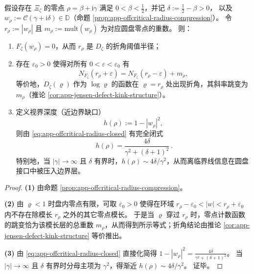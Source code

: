 \begin{theorem}[离临界线信息的折角定位与视界深度]\label{thm:app-jensen-offcritical-kink-localization}
假设存在 \(\Xi_{\zeta}\) 的零点 \(\rho=\beta+\mathrm{i}\gamma\) 满足 \(0<\beta<\tfrac12\)，并记 \(\delta:=\tfrac12-\beta>0\)，
以及 \(w_{\rho}:=\mathcal{C}(\gamma+\mathrm{i}\delta)\in\mathbb{D}\)（命题 \ref{prop:app-offcritical-radius-compression}）。
令 \(r_{\rho}:=|w_{\rho}|\) 且 \(m_{\rho}:=\mathrm{mult}(w_{\rho})\) 为对应圆盘零点的重数。
则：
\begin{enumerate}
  \item \(F_{\zeta}(w_{\rho})=0\)，从而 \(r_{\rho}\) 是 \(D_{\zeta}\) 的折角阈值半径；
  \item 存在 \(\varepsilon_0>0\) 使得对所有 \(0<\varepsilon<\varepsilon_0\) 有
  \[
  N_{F_{\zeta}}(r_{\rho}+\varepsilon)=N_{F_{\zeta}}(r_{\rho}-\varepsilon)+m_{\rho},
  \]
  等价地，\(D_{\zeta}(\varrho)\) 作为 \(\log\varrho\) 的函数在 \(\varrho=r_{\rho}\) 处出现折角，其斜率跳变为 \(m_{\rho}\)（推论 \ref{cor:app-jensen-defect-kink-structure}）。
  \item 定义视界深度（近边界缺口）
  \[
  h(\rho):=1-|w_{\rho}|^{2},
  \]
  则由 \eqref{eq:app-offcritical-radius-closed} 有完全闭式
  \[
  \boxed{\ h(\rho)=\frac{4\delta}{\gamma^{2}+(\delta+1)^{2}}\ }.
  \]
  特别地，当 \(|\gamma|\to\infty\) 且 \(\delta\) 有界时，\(h(\rho)\sim 4\delta/\gamma^{2}\)，从而离临界线信息在圆盘接口中被压入边界层。
\end{enumerate}
\end{theorem}
\begin{proof}
\textbf{(1)} 由命题 \ref{prop:app-offcritical-radius-compression}。
\par
\textbf{(2)} 由 \(\varrho<1\) 时盘内零点有限，可取 \(\varepsilon_0>0\) 使得在环域
\(
r_{\rho}-\varepsilon_0<|w|<r_{\rho}+\varepsilon_0
\)
内不存在除模长 \(r_{\rho}\) 之外的其它零点模长。
于是当 \(\varrho\) 穿过 \(r_{\rho}\) 时，零点计数函数的跳变恰为该模长层的总重数 \(m_{\rho}\)，从而得到所示等式；折角结论由推论 \ref{cor:app-jensen-defect-kink-structure} 等价推出。
\par
\textbf{(3)} 由 \eqref{eq:app-offcritical-radius-closed} 直接化简得
\(
1-|w_{\rho}|^{2}=\frac{4\delta}{\gamma^{2}+(\delta+1)^{2}}
\)。
当 \(|\gamma|\to\infty\) 且 \(\delta\) 有界时分母主项为 \(\gamma^{2}\)，得渐近 \(h(\rho)\sim 4\delta/\gamma^{2}\)。
证毕。
\end{proof}

